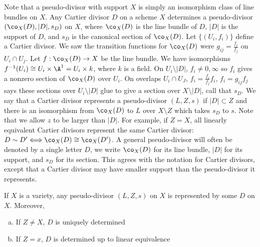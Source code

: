 Note that a pseudo-divisor with support $X$ is simply an isomorphism class of line bundles on $X$. Any Cartier divisor $D$ on a scheme $X$ determines a pseudo-divisor $(\co_X(D),|D|,s_D)$ on $X$, where $\co_X(D)$ is the line bundle of $D$, $|D|$ is the support of $D$, and $s_D$ is the canonical section of $\co_X(D)$. Let $\{(U_i,f_i)\}$ define a Cartier divisor. We saw the transition functions for $\co_X(D)$ were $g_{ij}=\frac{f_i}{f_j}$ on $U_i \cap U_j$. Let $f: \co_X(D) \to X$ be the line bundle. We have isomorphisms $f^{-1}(U_i) \cong U_i \times \A^1=U_i \times k$, where $k$ is a field. On $U_i \setminus |D|$, $f_i \neq 0,\infty$ so $f_i$ gives a nonzero section of $\co_X(D)$ over $U_i$. On overlaps $U_i \cap U_J$, $f_i=\frac{f_i}{f_j} f_i$, $f_i= g_{ij}f_j$ says these sections over $U_i \setminus |D|$ glue to give a section over $X \setminus |D|$, call that $s_D$. We say that a Cartier divisor represents a pseudo-divisor $(L,Z,s)$ if $|D| \subset Z$ and there is an isomorphism from $\co_X(D)$ to $L$ over $X \setminus Z$ which takes $s_D$ to $s$. Note that we allow $z$ to be larger than $|D|$. For example, if $Z=X$, all linearly equivalent Cartier divisors represent the same Cartier divisor: $D \sim D' \Longleftrightarrow \co_X(D) \cong \co_X(D')$. A general pseudo-divisor will often be denoted by a single letter $D$, we write $\co_X(D)$ for its line bundle, $|D|$ for its support, and $s_D$ for its section. This agrees with the notation for Cartier divisors, except that a Cartier divisor may have smaller support than the pseudo-divisor it represents. 


\begin{lem}
If $X$ is a variety, any pseudo-divisor $(L,Z,s)$ on $X$ is represented by some $D$ on $X$. Moreover,
	\begin{enumerate}[(a)]
	\item If $Z \neq X$, $D$ is uniquely determined 
	\item If $Z=x$, $D$ is determined up to linear equivalence
	\end{enumerate}
\end{lem}


